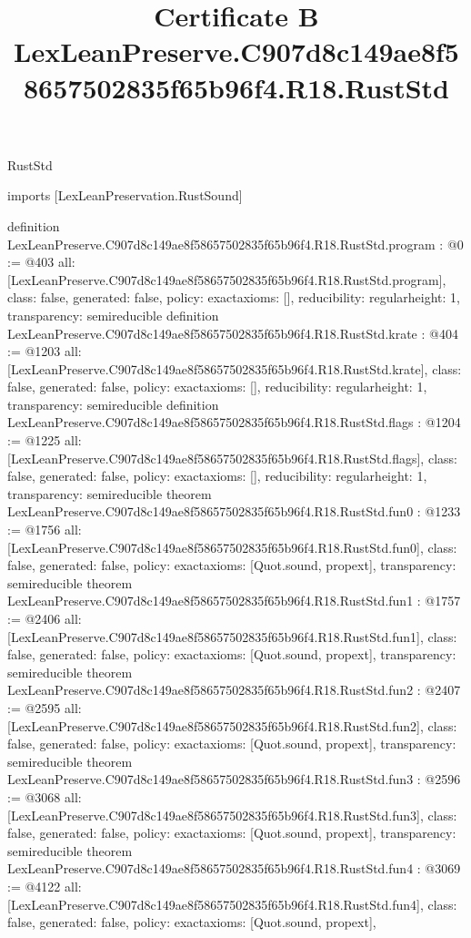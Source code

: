 \begin{lexlean}{RustStd}
\title{Certificate B LexLeanPreserve.C907d8c149ae8f58657502835f65b96f4.R18.RustStd}
\begin{coremodule}
imports [LexLeanPreservation.RustSound]

definition LexLeanPreserve.C907d8c149ae8f58657502835f65b96f4.R18.RustStd.program : @0 := @403 {
  all: [LexLeanPreserve.C907d8c149ae8f58657502835f65b96f4.R18.RustStd.program],
  class: false,
  generated: false,
  policy: exact{axioms: []},
  reducibility: regular{height: 1},
  transparency: semireducible
}
definition LexLeanPreserve.C907d8c149ae8f58657502835f65b96f4.R18.RustStd.krate : @404 := @1203 {
  all: [LexLeanPreserve.C907d8c149ae8f58657502835f65b96f4.R18.RustStd.krate],
  class: false,
  generated: false,
  policy: exact{axioms: []},
  reducibility: regular{height: 1},
  transparency: semireducible
}
definition LexLeanPreserve.C907d8c149ae8f58657502835f65b96f4.R18.RustStd.flags : @1204 := @1225 {
  all: [LexLeanPreserve.C907d8c149ae8f58657502835f65b96f4.R18.RustStd.flags],
  class: false,
  generated: false,
  policy: exact{axioms: []},
  reducibility: regular{height: 1},
  transparency: semireducible
}
theorem LexLeanPreserve.C907d8c149ae8f58657502835f65b96f4.R18.RustStd.fun0 : @1233 := @1756 {
  all: [LexLeanPreserve.C907d8c149ae8f58657502835f65b96f4.R18.RustStd.fun0],
  class: false,
  generated: false,
  policy: exact{axioms: [Quot.sound, propext]},
  transparency: semireducible
}
theorem LexLeanPreserve.C907d8c149ae8f58657502835f65b96f4.R18.RustStd.fun1 : @1757 := @2406 {
  all: [LexLeanPreserve.C907d8c149ae8f58657502835f65b96f4.R18.RustStd.fun1],
  class: false,
  generated: false,
  policy: exact{axioms: [Quot.sound, propext]},
  transparency: semireducible
}
theorem LexLeanPreserve.C907d8c149ae8f58657502835f65b96f4.R18.RustStd.fun2 : @2407 := @2595 {
  all: [LexLeanPreserve.C907d8c149ae8f58657502835f65b96f4.R18.RustStd.fun2],
  class: false,
  generated: false,
  policy: exact{axioms: [Quot.sound, propext]},
  transparency: semireducible
}
theorem LexLeanPreserve.C907d8c149ae8f58657502835f65b96f4.R18.RustStd.fun3 : @2596 := @3068 {
  all: [LexLeanPreserve.C907d8c149ae8f58657502835f65b96f4.R18.RustStd.fun3],
  class: false,
  generated: false,
  policy: exact{axioms: [Quot.sound, propext]},
  transparency: semireducible
}
theorem LexLeanPreserve.C907d8c149ae8f58657502835f65b96f4.R18.RustStd.fun4 : @3069 := @4122 {
  all: [LexLeanPreserve.C907d8c149ae8f58657502835f65b96f4.R18.RustStd.fun4],
  class: false,
  generated: false,
  policy: exact{axioms: [Quot.sound, propext]},
}
\end{coremodule}
\end{lexlean}
